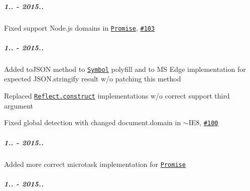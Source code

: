\subparagraph*{1.. -\/ 2015..}


\begin{DoxyItemize}
\item Fixed support Node.\+js domains in \href{https://github.com/zloirock/core-js/#ecmascript-6-promise}{\tt {\ttfamily Promise}}, \href{https://github.com/zloirock/core-js/issues/103}{\tt \#103}
\end{DoxyItemize}

\subparagraph*{1.. -\/ 2015..}


\begin{DoxyItemize}
\item Added {\ttfamily to\+J\+S\+ON} method to \href{https://github.com/zloirock/core-js/#ecmascript-6-symbol}{\tt {\ttfamily Symbol}} polyfill and to MS Edge implementation for expected {\ttfamily J\+S\+O\+N.\+stringify} result w/o patching this method
\item Replaced \href{https://github.com/zloirock/core-js/#ecmascript-6-reflect}{\tt {\ttfamily Reflect.\+construct}} implementations w/o correct support third argument
\item Fixed {\ttfamily global} detection with changed {\ttfamily document.\+domain} in $\sim$\+I\+E8, \href{https://github.com/zloirock/core-js/issues/100}{\tt \#100}
\end{DoxyItemize}

\subparagraph*{1.. -\/ 2015..}


\begin{DoxyItemize}
\item Added more correct microtask implementation for \href{#ecmascript-6-promise}{\tt {\ttfamily Promise}}
\end{DoxyItemize}

\subparagraph*{1.. -\/ 2015..}


